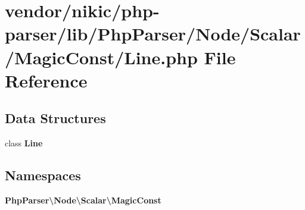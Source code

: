 \section{vendor/nikic/php-\/parser/lib/\+Php\+Parser/\+Node/\+Scalar/\+Magic\+Const/\+Line.php File Reference}
\label{nikic_2php-parser_2lib_2_php_parser_2_node_2_scalar_2_magic_const_2_line_8php}
\subsection*{Data Structures}
\begin{DoxyCompactItemize}
\item 
class {\bf Line}
\end{DoxyCompactItemize}
\subsection*{Namespaces}
\begin{DoxyCompactItemize}
\item 
 {\bf Php\+Parser\textbackslash{}\+Node\textbackslash{}\+Scalar\textbackslash{}\+Magic\+Const}
\end{DoxyCompactItemize}
